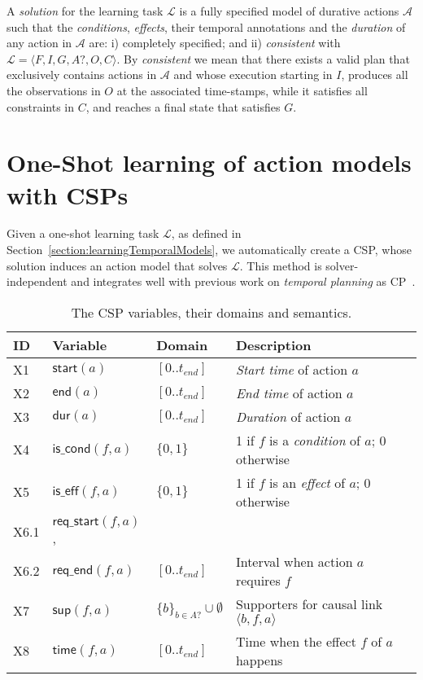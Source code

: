\documentclass{ecai}
\newcommand{\tup}[1]{{\langle #1 \rangle}}
\newcommand{\dur}{\mathsf{dur}}    %
\newcommand{\iscond}{\mathsf{is\_cond}}    %
\newcommand{\iseff}{\mathsf{is\_eff}}    %
\newcommand{\start}{\mathsf{start}}%
\newcommand{\en}{\mathsf{end}}     %
\newcommand{\supp}{\mathsf{sup}}   %
\newcommand{\tim}{\mathsf{time}}   %
\newcommand{\reqs}{\mathsf{req\_{start}}} %
\newcommand{\reqe}{\mathsf{req\_{end}}}   %
\begin{document}
A {\em solution} for the learning task $\mathcal{L}$ is a fully specified model of durative actions $\mathcal{A}$ such that the {\em conditions}, {\em effects}, their temporal annotations and the {\em duration} of any action in $\mathcal{A}$ are: i) completely specified; and ii) {\em consistent} with $\mathcal{L}=\tup{F,I,G,A?,O,C}$. By {\em consistent} we mean that there exists a valid plan that exclusively contains actions in $\mathcal{A}$ and whose execution starting in $I$, produces all the observations in $O$ at the associated time-stamps, while it satisfies all constraints in $C$, and reaches a final state that satisfies $G$.



\section{One-Shot learning of action models with CSPs}
\label{section:learningAsCSP}
Given a one-shot learning task $\mathcal{L}$, as defined in Section~\ref{section:learningTemporalModels}, we automatically create a CSP, whose solution induces an action model that solves $\mathcal{L}$. This method is solver-independent and integrates well with previous work on {\em temporal planning} as CP~\cite{garrido2009constraint,vidal2006branching}. 

\begin{table}
\begin{center}
\caption{The CSP variables, their domains and semantics.}
\begin{scriptsize}
\begin{tabular}{p{0.3cm}p{1.3cm}p{1.5cm}p{3.8cm}}
\hline	
{\bf ID} & {\bf Variable} & {\bf Domain} & {\bf Description} \\
\hline
X1 &$\start(a)$ & $[0..t_{end}]$ & {\em Start time} of action $a$ \\
X2 &$\en(a)$ & $[0..t_{end}]$ & {\em End time} of action $a$ \\
X3 &$\dur(a)$ & $[0..t_{end}]$ & {\em Duration} of action $a$ \\

X4 &$\iscond(f,a)$ & $\{0,1\}$ & 1 if $f$ is a {\em condition} of $a$; 0 otherwise \\
X5 &$\iseff(f,a)$ & $\{0,1\}$ & 1 if $f$ is an {\em effect} of $a$; 0 otherwise \\

X6.1 &$\reqs(f,a)$, &  & \\ 
X6.2 &$\reqe(f,a)$  & $[0..t_{end}]$ & Interval when action $a$ requires $f$ \\

X7 &$\supp(f,a)$ & $\{b\}_{b\in A?} \cup \emptyset $&  Supporters for causal link $\tup{b,f,a}$ \\ 
X8 &$\tim(f,a)$ & $[0..t_{end}]$ & Time when the effect $f$ of $a$ happens\\

\end{tabular}
\end{scriptsize}
\label{table:variables}
\end{center}
\end{table}
\end{document}
